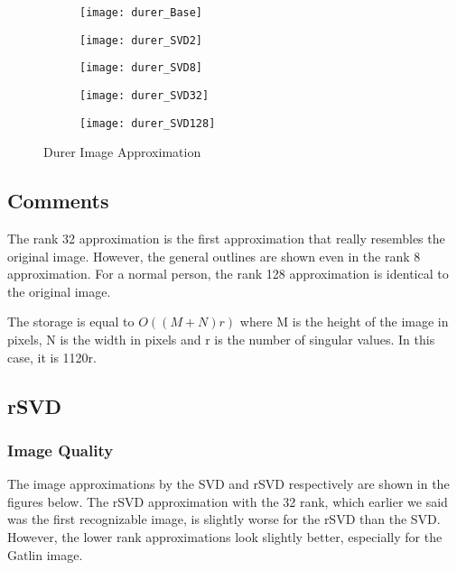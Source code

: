 \documentclass{article}
\begin{document}
\begin{figure}[h!]

\begin{subfigure}{.5\textwidth}
  \centering
  \texttt{[image: durer\_Base]}
\end{subfigure}%
\begin{subfigure}{.5\textwidth}
  \centering
  \texttt{[image: durer\_SVD2]}
\end{subfigure}

\begin{subfigure}{.5\textwidth}
  \centering
  \texttt{[image: durer\_SVD8]}
\end{subfigure}
\begin{subfigure}{.5\textwidth}
  \centering
  \texttt{[image: durer\_SVD32]}
\end{subfigure}

\begin{subfigure}{.5\textwidth}
  \centering
  \texttt{[image: durer\_SVD128]}
\end{subfigure}
\caption{Durer Image Approximation}
\end{figure}

\subsection{Comments}

The rank 32 approximation is the first approximation that really resembles the original image. However, the general outlines are shown even in the rank 8 approximation. For a normal person, the rank 128 approximation is identical to the original image.

The storage is equal to $O((M+N)r)$ where M is the height of the image in pixels, N is the width in pixels and r is the number of singular values. In this case, it is 1120r.

\subsection{rSVD}

\subsubsection{Image Quality}

The image approximations by the SVD and rSVD respectively are shown in the figures below. The rSVD approximation with the 32 rank, which earlier we said was the first recognizable image, is slightly worse for the rSVD than the SVD. However, the lower rank approximations look slightly better, especially for the Gatlin image.
\end{document}
